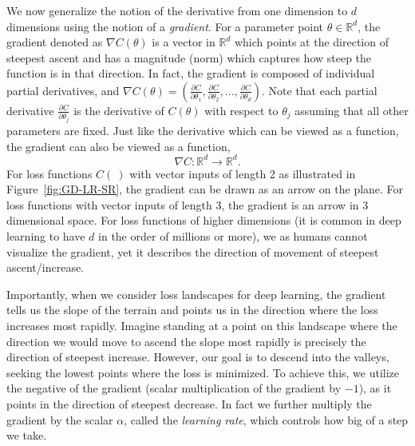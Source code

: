 \documentclass[12pt]{article}
\begin{document}
We now generalize the notion of the derivative from one dimension to $d$ dimensions using the notion of a {\em gradient}. For a parameter point $\theta \in {\mathbb R}^d$, the gradient denoted as $\nabla C(\theta)$ is a vector in ${\mathbb R}^d$ which points at the direction of steepest ascent and has a magnitude (norm) which captures how steep the function is in that direction. In fact, the gradient is composed of individual partial derivatives, and $\nabla C(\theta) =  \left(\frac{\partial C}{\partial \theta_1}, \frac{\partial C}{\partial \theta_2}, ..., \frac{\partial C}{\partial \theta_d}\right)$. Note that each partial derivative $\frac{\partial C}{\partial \theta_j}$ is the derivative of $C(\theta)$ with respect to $\theta_j$ assuming that all other parameters are fixed. Just like the derivative which can be viewed as a function, the gradient can also be viewed as a function,
%
\begin{equation}
\label{eq:grad-def}
\nabla C: {\mathbb R}^d \to {\mathbb R}^d.
\end{equation}
%
For loss functions $C(~)$ with vector inputs of length 2 as illustrated in Figure~\ref{fig:GD-LR-SR}, the gradient can be drawn as an arrow on the plane. For loss functions with vector inputs of length 3, the gradient is an arrow in 3 dimensional space. For loss functions of higher dimensions (it is common in deep learning to have $d$ in the order of millions or more), we as humans cannot visualize the gradient, yet it describes the direction of movement of steepest ascent/increase. 

Importantly, when we consider loss landscapes for deep learning, the gradient tells us the slope of the terrain and points us in the direction where the loss increases most rapidly. Imagine standing at a point on this landscape where the direction we would move to ascend the slope most rapidly is precisely the direction of steepest increase. However, our goal is to descend into the valleys, seeking the lowest points where the loss is minimized. To achieve this, we utilize the negative of the gradient (scalar multiplication of the gradient by $-1$), as it points in the direction of steepest decrease. In fact we further multiply the gradient by the scalar $\alpha$, called the {\em learning rate}, which controls how big of a step we take.
\end{document}
